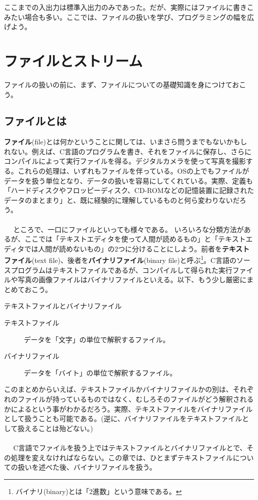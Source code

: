 ここまでの入出力は標準入出力のみであった。だが、実際にはファイルに書きこみたい場合も多い。ここでは、ファイルの扱いを学び、プログラミングの幅を広げよう。

\section{ファイルとストリーム}
ファイルの扱いの前に、まず、ファイルについての基礎知識を身につけておこう。
\subsection{ファイルとは}
\textbf{ファイル}(file)とは何かということに関しては、いまさら問うまでもないかもしれない。例えば、C言語のプログラムを書き、それをファイルに保存し、さらにコンパイルによって実行ファイルを得る。デジタルカメラを使って写真を撮影する。これらの処理は、いずれもファイルを伴っている。OSの上でもファイルがデータを扱う単位となり、データの扱いを容易にしてくれている。実際、定義も「ハードディスクやフロッピーディスク、CD-ROMなどの記憶装置に記録されたデータのまとまり」と、既に経験的に理解しているものと何ら変わりないだろう。
\\ \\　
ところで、一口にファイルといっても様々である。
いろいろな分類方法があるが、ここでは「テキストエディタを使って人間が読めるもの」と「テキストエディタでは人間が読めないもの」の2つに分けることにしよう。前者を\textbf{テキストファイル}(text file)、後者を\textbf{バイナリファイル}(binary file)と呼ぶ\footnote{バイナリ(binary)とは「2進数」という意味である。}。C言語のソースプログラムはテキストファイルであるが、コンパイルして得られた実行ファイルや写真の画像ファイルはバイナリファイルといえる。以下、もう少し厳密にまとめておこう。
\begin{itembox}[l]{テキストファイルとバイナリファイル}
\begin{description}
\item[テキストファイル] データを「文字」の単位で解釈するファイル。
\item[バイナリファイル] データを「バイト」の単位で解釈するファイル。
\end{description}
\end{itembox}

このまとめからいえば、テキストファイルかバイナリファイルかの別は、それぞれのファイルが持っているものではなく、むしろそのファイルがどう解釈されるかによるという事がわかるだろう。実際、テキストファイルをバイナリファイルとして扱うことも可能である。(逆に、バイナリファイルをテキストファイルとして扱えることは殆どない。)
\\ \\　
C言語でファイルを扱う上ではテキストファイルとバイナリファイルとで、その処理を変えなければならない。この章では、ひとまずテキストファイルについての扱いを述べた後、バイナリファイルを扱う。

